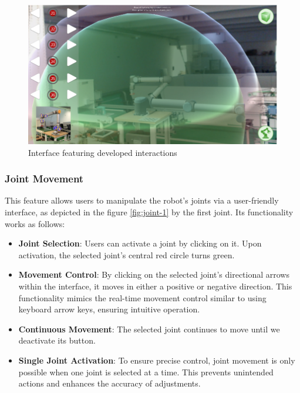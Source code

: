         \begin{figure}[h]
            \centering
            \includegraphics[width=1\linewidth]{figs/interface.png}
            \caption{Interface featuring developed interactions}
            \label{fig: interface}
        \end{figure}

        \subsubsection{Joint Movement}

            This feature allows users to manipulate the robot's joints via a user-friendly interface, as depicted in the figure \ref{fig:joint-1} 
            by the first joint. Its functionality works as follows:


            \begin{itemize}
                \item \textbf{Joint Selection}: Users can activate a joint by clicking on it. Upon activation, the 
                selected joint's central red circle turns green.
                \item \textbf{Movement Control}: By clicking on the selected joint's directional arrows within the interface, it moves in either a 
                positive or negative direction. This functionality mimics the real-time movement control similar to using keyboard arrow keys, ensuring 
                intuitive operation.
                \item \textbf{Continuous Movement}: The selected joint continues to move until we deactivate its button.
                \item \textbf{Single Joint Activation}: To ensure precise control, joint movement is only possible when one joint is selected at a time. 
                This prevents unintended actions and enhances the accuracy of adjustments.
            \end{itemize}
        
